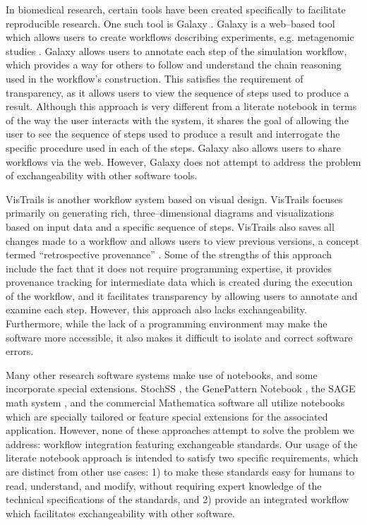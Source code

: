 \documentclass[10pt,letterpaper]{article}
\begin{document}
In biomedical research, certain tools have been created specifically to facilitate reproducible research. One such tool is Galaxy \cite{goecks2010galaxy}. Galaxy is a web--based tool which allows users to create workflows describing experiments, e.g. metagenomic studies \cite{pond2009windshield}. Galaxy allows users to annotate each step of the simulation workflow, which provides a way for others to follow and understand the chain reasoning used in the workflow's construction. This satisfies the requirement of transparency, as it allows users to view the sequence of steps used to produce a result. Although this approach is very different from a literate notebook in terms of the way the user interacts with the system, it shares the goal of allowing the user to see the sequence of steps used to produce a result and interrogate the specific procedure used in each of the steps. Galaxy also allows users to share workflows via the web. However, Galaxy does not attempt to address the problem of exchangeability with other software tools.

VisTrails \cite{callahan2006vistrails} is another workflow system based on visual design. VisTrails focuses primarily on generating rich, three--dimensional diagrams and visualizations based on input data and a specific sequence of steps. VisTrails also saves all changes made to a workflow and allows users to view previous versions, a concept termed ``retrospective provenance'' \cite{piccolo2016tools}. Some of the strengths of this approach include the fact that it does not require programming expertise, it provides provenance tracking for intermediate data which is created during the execution of the workflow, and it facilitates transparency by allowing users to annotate and examine each step. However, this approach also lacks exchangeability. Furthermore, while the lack of a programming environment may make the software more accessible, it also makes it difficult to isolate and correct software errors.

Many other research software systems make use of notebooks, and some incorporate special extensions. StochSS \cite{drawert2016stochastic}, the GenePattern Notebook \cite{reich2017genepattern}, the SAGE math system \cite{erocal2010sage}, and the commercial Mathematica software \cite{wolfram1996mathematica} all utilize notebooks which are specially tailored or feature special extensions for the associated application. However, none of these approaches attempt to solve the problem we address: workflow integration featuring exchangeable standards. Our usage of the literate notebook approach is intended to satisfy two specific requirements, which are distinct from other use cases: 1) to make these standards easy for humans to read, understand, and modify, without requiring expert knowledge of the technical specifications of the standards, and 2) provide an integrated workflow which facilitates exchangeability with other software.
\end{document}
